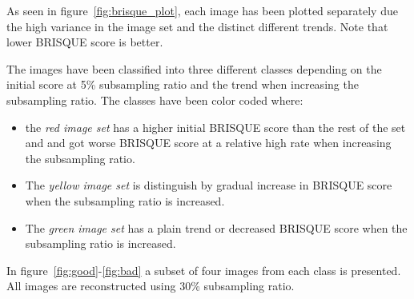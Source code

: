 As seen in figure~\ref{fig:brisque_plot}, each image has been plotted separately due the high variance in the image set and the distinct different trends. Note that lower BRISQUE score is better.


The images have been classified into three different classes depending on the initial score at 5\% subsampling ratio and the trend when increasing the subsampling ratio. The classes have been color coded where:

\begin{itemize}
\item the \textit{red image set} has a higher initial BRISQUE score than the rest of the set and and got worse BRISQUE score at a relative high rate when increasing the subsampling ratio.

\item The \textit{yellow image set} is distinguish by gradual increase in BRISQUE score when the subsampling ratio is increased.

\item The \textit{green image set} has a plain trend or decreased BRISQUE score when the subsampling ratio is increased.
\end{itemize}

 

In figure~\ref{fig:good}-\ref{fig:bad} a subset of four images from each class is presented. All images are reconstructed using 30\% subsampling ratio. 



